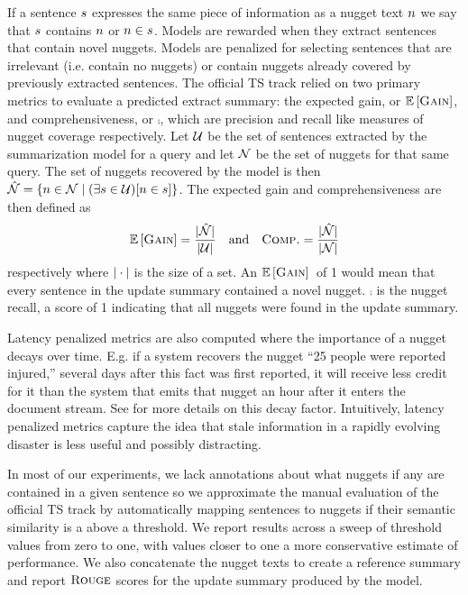 
If a sentence $s$ 
expresses the same piece of information as a nugget text $n$ 
we say that $s$ contains $n$ or $n \in s$.
Models are rewarded when they extract sentences that contain 
novel nuggets. Models are penalized for 
selecting sentences that are irrelevant (i.e. contain no nuggets) or 
contain nuggets already covered by previously extracted sentences. 
   The official TS track relied on two primary metrics to 
evaluate a predicted extract summary: 
the expected gain, or $\mathbb{E}\left[\textsc{Gain}\right]$, and 
comprehensiveness, or $\comp$, which are precision and recall like measures of nugget coverage respectively. Let $\mathcal{U}$ be the set 
of sentences extracted by the summarization model for a query and let 
$\mathcal{N}{}$ be the set of nuggets for that same query. The set of nuggets
recovered by the model is then $\hat{\mathcal{N}} = \{n \in \mathcal{N} \;|\;
(\exists s \in \mathcal{U})[n \in s] \}$.
The expected gain and comprehensiveness are then defined as 
    \[ \mathbb{E}\left[\textsc{Gain}\right] = \frac{|\hat{\mathcal{N}}|}{|\mathcal{U}|} 
            \quad \textrm{and} \quad 
        \textsc{Comp.} = \frac{|\hat{\mathcal{N}}|}{|\mathcal{N}|} \]
        respectively where $| \cdot |$ is the size of a set.
    An $\mathbb{E}\left[\textsc{Gain}\right]{}$ of 1 would mean that every sentence in
    the update summary contained a novel nugget. $\comp{}$ is the 
    nugget recall, a score of 1 indicating that all nuggets were found
    in the update summary.
 
Latency penalized metrics are also computed where
the importance of a nugget decays over time. E.g. if a system
recovers the nugget ``25 people were reported injured,'' several days
after this fact was first reported, it will receive less credit for it
than the system that emits that nugget an hour after it enters the 
document stream. See \cite{aslam2014trec} for more details on this decay 
factor. Intuitively, latency penalized metrics capture the idea that stale
information in a rapidly evolving disaster is less useful and possibly
distracting.

 In most of our experiments, we lack annotations about what nuggets if 
 any are contained in a given sentence so we 
  approximate the manual evaluation of the official TS
  track
   by automatically mapping sentences to nuggets if their semantic similarity
   \citep{guo2012simple}
   is a above a threshold. We report results across a sweep of threshold 
   values from zero to one, with values closer to one a more conservative
   estimate of performance. 
   We also concatenate the nugget texts to create a reference summary and
   report $\textsc{Rouge}$ scores \citep{lin2004rouge} for the update summary produced
    by the model.

